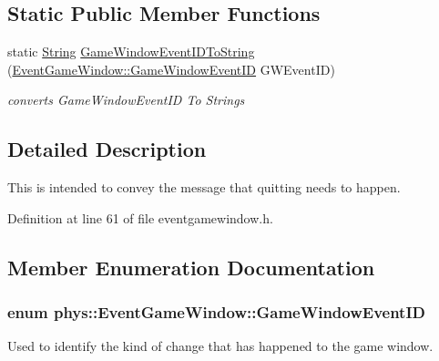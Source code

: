 \subsection*{Static Public Member Functions}
\begin{DoxyCompactItemize}
\item 
static \hyperlink{namespacephys_aa03900411993de7fbfec4789bc1d392e}{String} \hyperlink{classphys_1_1EventGameWindow_a643c70f9137ea6812e53fa0993cd783a}{GameWindowEventIDToString} (\hyperlink{classphys_1_1EventGameWindow_a45225255070513d3cff88cdfea25cc09}{EventGameWindow::GameWindowEventID} GWEventID)
\begin{DoxyCompactList}\small\item\em converts GameWindowEventID To Strings \item\end{DoxyCompactList}\end{DoxyCompactItemize}


\subsection{Detailed Description}
This is intended to convey the message that quitting needs to happen. 

Definition at line 61 of file eventgamewindow.h.



\subsection{Member Enumeration Documentation}
\hypertarget{classphys_1_1EventGameWindow_a45225255070513d3cff88cdfea25cc09}{
\subsubsection[{GameWindowEventID}]{\setlength{\rightskip}{0pt plus 5cm}enum {\bf phys::EventGameWindow::GameWindowEventID}}}
\label{d4/d0f/classphys_1_1EventGameWindow_a45225255070513d3cff88cdfea25cc09}


Used to identify the kind of change that has happened to the game window. 

